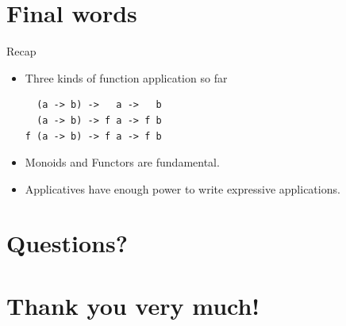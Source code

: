 \documentclass[presentation,aspectratio=169,smaller]{beamer}
\begin{document}
\section*{Final words}
\label{sec:org2f1e316}
\begin{frame}[label={sec:orgee97a87},fragile]{Recap}
 \begin{itemize}
\item <1-> Three kinds of function application so far
\begin{verbatim}
  (a -> b) ->   a ->   b
  (a -> b) -> f a -> f b
f (a -> b) -> f a -> f b
\end{verbatim}

\item <2-> Monoids and Functors are fundamental.

\item <3-> Applicatives have enough power to write expressive applications.
\end{itemize}
\end{frame}

\section{Questions?}
\label{sec:orga97afe6}

\section{Thank you very much!}
\label{sec:orgdb27a11}
\end{document}
